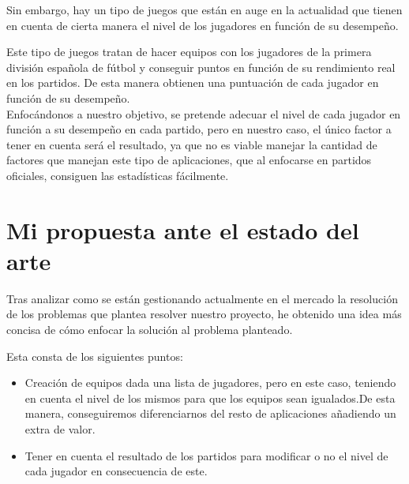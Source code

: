 Sin embargo, hay un tipo de juegos que están en auge en la actualidad que tienen en cuenta de cierta manera el nivel de los
jugadores en función de su desempeño.

Este tipo de juegos tratan de hacer equipos con los jugadores de la primera división española de fútbol y conseguir puntos en función
de su rendimiento real en los partidos. De esta manera obtienen una puntuación de cada jugador en función de su desempeño.\\

Enfocándonos a nuestro objetivo, se pretende adecuar el nivel de cada jugador en función a su desempeño en cada partido, pero en nuestro caso,
el único factor a tener en cuenta será el resultado, ya que no es viable manejar la cantidad de factores que manejan este tipo de aplicaciones,
que al enfocarse en partidos oficiales, consiguen las estadísticas fácilmente.

\section{Mi propuesta ante el estado del arte}

Tras analizar como se están gestionando actualmente en el mercado la resolución de los problemas que plantea resolver nuestro proyecto, he obtenido
una idea más concisa de cómo enfocar la solución al problema planteado.

Esta consta de los siguientes puntos:

\begin{itemize}
    \item Creación de equipos dada una lista de jugadores, pero en este caso, teniendo en cuenta el nivel de los mismos para que los equipos sean igualados.De esta manera, conseguiremos diferenciarnos
    del resto de aplicaciones añadiendo un extra de valor.
    \item Tener en cuenta el resultado de los partidos para modificar o no el nivel de cada jugador en consecuencia de este.
\end{itemize}
